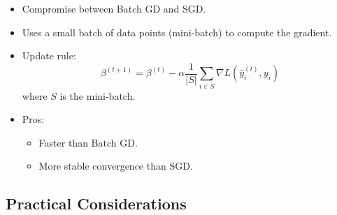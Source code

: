 \documentclass{article}
\begin{document}
\begin{itemize}
    \begin{itemize}
        \item Compromise between Batch GD and SGD.
        \item Uses a small batch of data points (mini-batch) to compute the gradient.
        \item Update rule:
        \[
        \beta^{(t+1)} = \beta^{(t)} - \alpha \frac{1}{|S|} \sum_{i \in S} \nabla L(\hat{y}_i^{(t)}, y_i)
        \]
        where $S$ is the mini-batch.
        \item Pros:
        \begin{itemize}
            \item Faster than Batch GD.
            \item More stable convergence than SGD.
        \end{itemize}
    \end{itemize}
\end{itemize}

\subsection{Practical Considerations}
\end{document}
